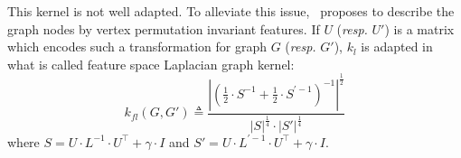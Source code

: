                     This kernel is not well adapted.
                    To alleviate this issue,~\textcite{kondor2016multiscale} proposes to describe the graph nodes by vertex permutation invariant features.
                    If $U$ (\textit{resp.} $U'$) is a matrix which encodes such a transformation for graph $G$ (\textit{resp.} $G'$), $k_{l}$ is adapted in what is called feature space Laplacian graph kernel:
                    \begin{equation}
                        \label{eq::feature_laplacian_kernel}
                        k_{fl}(G, G') \triangleq \frac{\left\lvert \left(\frac{1}{2} \cdot S^{-1} + \frac{1}{2} \cdot S^{\prime -1} \right)^{-1} \right\rvert^{\frac{1}{2}}}{\left\lvert S\right\rvert^{\frac{1}{4}}\cdot\left\lvert S' \right\rvert^{\frac{1}{4}}}
                    \end{equation}
                    where $S = U\cdot L^{-1}\cdot U^\intercal + \gamma \cdot I$ and $S' = U\cdot L^{\prime -1}\cdot U^\intercal + \gamma \cdot I$.\\

